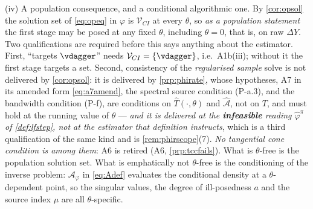 \begin{remark}[R1]
(iv) A population consequence, and a conditional algorithmic one. By \cref{cor:opsol} the
solution set of \eqref{eq:opeq} in $\varphi$ is $\mathcal V_{CI}$ at every $\theta$, so \emph{as a
population statement} the first stage may be posed at any fixed $\theta$, including $\theta=0$, that is,
on raw $\Delta Y$. Two qualifications are required before this says anything about the estimator. First,
``targets $\vdagger$'' needs $\mathcal V_{CI}=\{\vdagger\}$, i.e.\ A1b(iii); without it the first stage
targets a set. Second, consistency of the \emph{regularised sample} solve is not delivered by
\cref{cor:opsol}: it is delivered by \cref{prp:phirate}, whose hypotheses, A7 in its amended form
\eqref{eq:a7amend}, the spectral source condition (P-a.3), and the bandwidth condition (P-f), are conditions on
$\hat T(\cdot,\theta)$ and $\hat{\mathcal A}$, not on $T$, and must hold at the running value of
$\theta$ --- \emph{and it is delivered at the \textbf{infeasible} reading $\hat\varphi^{\pi}$ of
\cref{def:lfstep}, not at the estimator that definition instructs}, which is a third qualification of
the same kind and is \cref{rem:phirscope}\textup{(7)}. \emph{No tangential cone condition is among them}: A6 is retired
(A6, \cref{prp:tccfails}). What is $\theta$-free is the population
solution set.
What is emphatically not $\theta$-free is the conditioning of the inverse problem: $\mathcal A_\varphi$
in \eqref{eq:Adef} evaluates the conditional density at a $\theta$-dependent point, so the singular
values, the degree of ill-posedness $a$ and the source index $\mu$ are all $\theta$-specific.
\end{remark}


